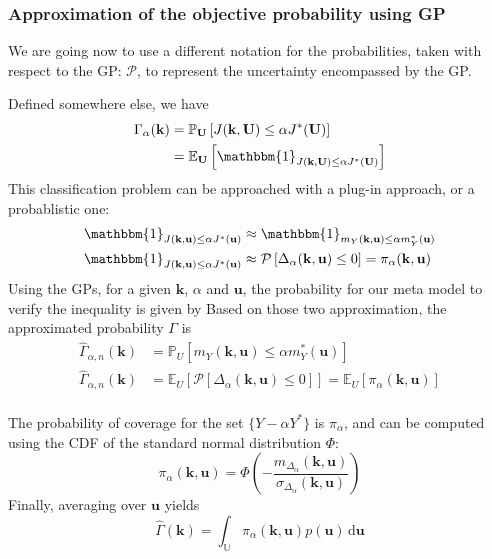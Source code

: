 \documentclass[a4paper,11pt]{article}
\newcommand{\Ex}{\mathbb{E}}
\newcommand{\Prob}{\mathbb{P}}
\newcommand{\ProbGP}{\mathcal{P}}
\newcommand{\Uspace}{\mathbb{U}}
\begin{document}
\subsubsection{Approximation of the objective probability using GP}
We are going now to use a different notation for the probabilities, taken with respect to the GP: $\ProbGP$, to represent the uncertainty encompassed by the GP.

Defined somewhere else, we have
\begin{align}
  \Gamma_{\alpha}(\mathbf{k}) &= \Prob_{\mathbf{U}}\left[J(\mathbf{k},\mathbf{U}) \leq \alpha J^*(\mathbf{U})\right] \\
                              & =\Ex_{\mathbf{U}}\left[\mathbbm{1}_{J(\mathbf{k},\mathbf{U}) \leq \alpha J^*(\mathbf{U})}\right]
\end{align}
This classification problem can be approached with a plug-in approach, or a probablistic one:
\begin{align}
  \mathbbm{1}_{J(\mathbf{k},\mathbf{u}) \leq \alpha J^*(\mathbf{u})} &\approx   \mathbbm{1}_{m_Y(\mathbf{k},\mathbf{u}) \leq \alpha m_Y^*(\mathbf{u})} \\
  \mathbbm{1}_{J(\mathbf{k},\mathbf{u}) \leq \alpha J^*(\mathbf{u})} &\approx   \ProbGP\left[ \Delta_{\alpha}(\mathbf{k},\mathbf{u}) \leq 0 \right] = \pi_{\alpha}(\mathbf{k},\mathbf{u})
\end{align}
Using the GPs, for a given $\mathbf{k}$, $\alpha$ and $\mathbf{u}$, the probability for our meta model to verify the inequality is given by
Based on those two approximation, the approximated probability $\Gamma$ is
\begin{align}
  \hat{\Gamma}_{\alpha, n}(\mathbf{k}) &= \Prob_U\left[m_Y(\mathbf{k},\mathbf{u}) \leq \alpha m_Y^*(\mathbf{u}) \right] \tag{plug-in} \\
  \hat{\Gamma}_{\alpha, n}(\mathbf{k}) &= \Ex_U\left[ \ProbGP\left[ \Delta_{\alpha}(\mathbf{k},\mathbf{u}) \leq 0\right]\right]  = \Ex_U\left[\pi_{\alpha}(\mathbf{k},\mathbf{u})\right]\tag{Probabilistic approx} \\
\end{align}

The probability of coverage for the set $\{Y - \alpha Y^*\}$ is $\pi_{\alpha}$, and can be computed using the CDF of the standard normal distribution $\Phi$:
\begin{equation}
  \pi_{\alpha}(\mathbf{k},\mathbf{u}) = \Phi\left(-\frac{m_{\Delta_\alpha}(\mathbf{k},\mathbf{u})}{\sigma_{\Delta_\alpha}(\mathbf{k},\mathbf{u})}\right)
\end{equation}
Finally, averaging over $\mathbf{u}$ yields
\begin{equation}
  \hat{\Gamma}(\mathbf{k}) = \int_{\Uspace}\pi_{\alpha}(\mathbf{k},\mathbf{u})p(\mathbf{u}) \,\mathrm{d}\mathbf{u}
\end{equation}
\end{document}
